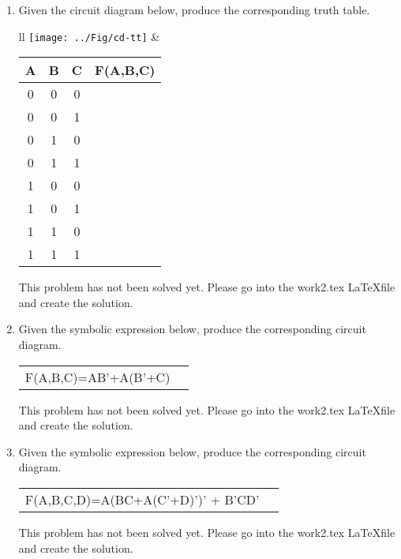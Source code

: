 \begin{enumerate}
\item Given the circuit diagram below, produce the corresponding truth table.

\begin{tabular}{ll}
	\texttt{[image: ../Fig/cd-tt]}
&
	\begin{tabular}{c|c|c||c}
	A & B & C & F(A,B,C) \\ \hline \hline
	0 & 0 & 0 &   \\ \hline
	0 & 0 & 1 &   \\ \hline
	0 & 1 & 0 &   \\ \hline
	0 & 1 & 1 &   \\ \hline
	1 & 0 & 0 &   \\ \hline
	1 & 0 & 1 &   \\ \hline
	1 & 1 & 0 &   \\ \hline
	1 & 1 & 1 &   \\
	\end{tabular}	
\end{tabular}

\begin{onlysolution}
This problem has not been solved yet.  Please go into the work2.tex \LaTeX file and create the solution.
\end{onlysolution}



\item Given the symbolic expression below, produce the corresponding circuit diagram.

\begin{tabular}{lp{2in}}
F(A,B,C)=AB'+A(B'+C)  & \\
\end{tabular}
\begin{onlysolution}
This problem has not been solved yet.  Please go into the work2.tex \LaTeX file and create the solution.
\end{onlysolution}
\vspace{3cm}

\item Given the symbolic expression below, produce the corresponding circuit diagram.

\begin{tabular}{lp{2in}}
F(A,B,C,D)=A(BC+A(C'+D)')' + B'CD'  & \\
\end{tabular}
\begin{onlysolution}
This problem has not been solved yet.  Please go into the work2.tex \LaTeX file and create the solution.
\end{onlysolution}
\vspace{3cm}


\end{enumerate}

